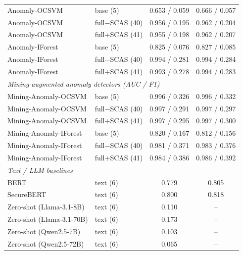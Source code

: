 \begin{longtable}{llcc}
Anomaly-OCSVM & base (5) & 0.653 / 0.059 & 0.666 / 0.057 \\
Anomaly-OCSVM & full$-$SCAS (40) & 0.956 / 0.195 & 0.962 / 0.204 \\
Anomaly-OCSVM & full$+$SCAS (41) & 0.955 / 0.198 & 0.962 / 0.207 \\
Anomaly-IForest & base (5) & 0.825 / 0.076 & 0.827 / 0.085 \\
Anomaly-IForest & full$-$SCAS (40) & 0.994 / 0.281 & 0.994 / 0.284 \\
Anomaly-IForest & full$+$SCAS (41) & 0.993 / 0.278 & 0.994 / 0.283 \\[2pt]
\multicolumn{4}{l}{\textit{Mining-augmented anomaly detectors (AUC / F1)}} \\
Mining-Anomaly-OCSVM & base (5) & 0.996 / 0.326 & 0.996 / 0.332 \\
Mining-Anomaly-OCSVM & full$-$SCAS (40) & 0.997 / 0.291 & 0.997 / 0.297 \\
Mining-Anomaly-OCSVM & full$+$SCAS (41) & 0.997 / 0.295 & 0.997 / 0.300 \\
Mining-Anomaly-IForest & base (5) & 0.820 / 0.167 & 0.812 / 0.156 \\
Mining-Anomaly-IForest & full$-$SCAS (40) & 0.981 / 0.371 & 0.983 / 0.376 \\
Mining-Anomaly-IForest & full$+$SCAS (41) & 0.984 / 0.386 & 0.986 / 0.392 \\[2pt]
\multicolumn{4}{l}{\textit{Text / LLM baselines}} \\
BERT & text (6) & 0.779 & 0.805 \\
SecureBERT & text (6) & 0.800 & 0.818 \\
Zero-shot (Llama-3.1-8B) & text (6) & 0.110 & -- \\
Zero-shot (Llama-3.1-70B) & text (6) & 0.173 & -- \\
Zero-shot (Qwen2.5-7B) & text (6) & 0.103 & -- \\
Zero-shot (Qwen2.5-72B) & text (6) & 0.065 & -- \\
\end{longtable}
